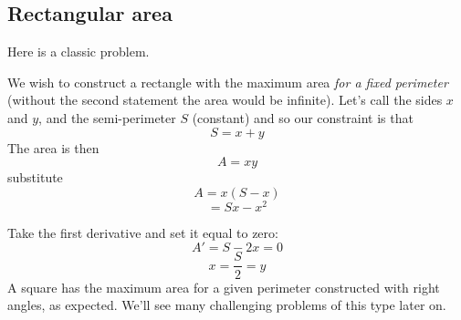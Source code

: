 \documentclass[11pt, oneside]{article}
\begin{document}
\subsection*{Rectangular area}
Here is a classic problem.

We wish to construct a rectangle with the maximum area \emph{for a fixed perimeter} (without the second statement the area would be infinite).  Let's call the sides $x$ and $y$, and the semi-perimeter $S$ (constant) and so our constraint is that 
\[ S = x + y \]
The area is then
\[ A = xy \]
substitute
\[ A = x (S - x) \]
\[ = Sx - x^2 \]

Take the first derivative and set it equal to zero:
\[ A' = S - 2x = 0 \]
\[ x = \frac{S}{2} = y \]
A square has the maximum area for a given perimeter constructed with right angles, as expected.  We'll see many challenging problems of this type later on.
\end{document}
